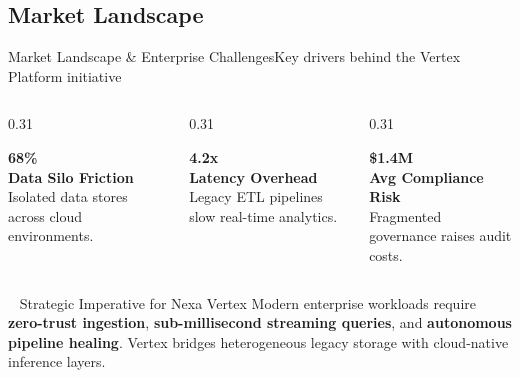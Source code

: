 \documentclass[aspectratio=169, 10pt]{beamer}
\begin{document}
\subsection{Market Landscape}
\begin{frame}{Market Landscape \& Enterprise Challenges}{Key drivers behind the Vertex Platform initiative}
  \begin{columns}[T]
    \begin{column}{0.31\textwidth}
      \begin{tcolorbox}[colback=white,colframe=RoyalAccent,arc=4pt,top=4pt,bottom=4pt,halign=center]
        {\large\bfseries\color{RoyalAccent} 68\%}\\[2pt]
        {\tiny\color{TextMain}\bfseries Data Silo Friction}\\
        {\tiny\color{TextMuted} Isolated data stores across cloud environments.}
      \end{tcolorbox}
    \end{column}
    \begin{column}{0.31\textwidth}
      \begin{tcolorbox}[colback=white,colframe=TealAccent,arc=4pt,top=4pt,bottom=4pt,halign=center]
        {\large\bfseries\color{TealAccent} 4.2x}\\[2pt]
        {\tiny\color{TextMain}\bfseries Latency Overhead}\\
        {\tiny\color{TextMuted} Legacy ETL pipelines slow real-time analytics.}
      \end{tcolorbox}
    \end{column}
    \begin{column}{0.31\textwidth}
      \begin{tcolorbox}[colback=white,colframe=SkyAccent,arc=4pt,top=4pt,bottom=4pt,halign=center]
        {\large\bfseries\color{SkyAccent} \$1.4M}\\[2pt]
        {\tiny\color{TextMain}\bfseries Avg Compliance Risk}\\
        {\tiny\color{TextMuted} Fragmented governance raises audit costs.}
      \end{tcolorbox}
    \end{column}
  \end{columns}

  \vspace*{0.1cm}
  \begin{featurebox}{\faBullseye~ Strategic Imperative for Nexa Vertex}
    \small
    Modern enterprise workloads require \textbf{zero-trust ingestion}, \textbf{sub-millisecond streaming queries}, and \textbf{autonomous pipeline healing}. Vertex bridges heterogeneous legacy storage with cloud-native inference layers.
  \end{featurebox}
\end{frame}
\end{document}
